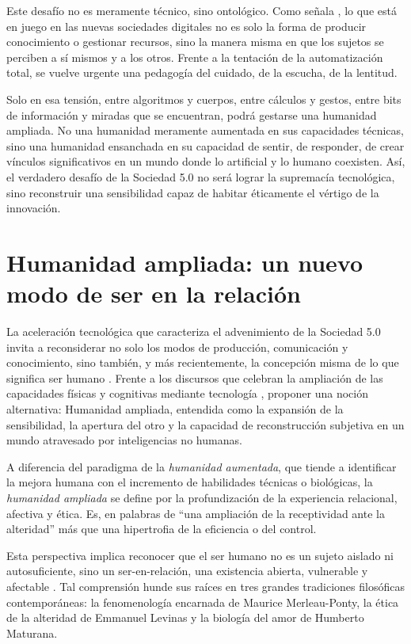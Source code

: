 \documentclass[spanish]{textolivre}
\begin{document}
Este desafío no es meramente técnico, sino ontológico. Como señala \textcite{sibilia2012}, lo que está en juego en las nuevas sociedades digitales no es solo la forma de producir conocimiento o gestionar recursos, sino la manera misma en que los sujetos se perciben a sí mismos y a los otros. Frente a la tentación de la automatización total, se vuelve urgente una pedagogía del cuidado, de la escucha, de la lentitud.

Solo en esa tensión, entre algoritmos y cuerpos, entre cálculos y gestos, entre bits de información y miradas que se encuentran, podrá gestarse una humanidad ampliada. No una humanidad meramente aumentada en sus capacidades técnicas, sino una humanidad ensanchada en su capacidad de sentir, de responder, de crear vínculos significativos en un mundo donde lo artificial y lo humano coexisten. Así, el verdadero desafío de la Sociedad 5.0 no será lograr la supremacía tecnológica, sino reconstruir una sensibilidad capaz de habitar éticamente el vértigo de la innovación.

\section{Humanidad ampliada: un nuevo modo de ser en la relación}
La aceleración tecnológica que caracteriza el advenimiento de la Sociedad 5.0 invita a reconsiderar no solo los modos de producción, comunicación y conocimiento, sino también, y más recientemente, la concepción misma de lo que significa ser humano \cite{bridle2018}. Frente a los discursos que celebran la ampliación de las capacidades físicas y cognitivas mediante tecnología \cite{harari2015}, proponer una noción alternativa: Humanidad ampliada, entendida como la expansión de la sensibilidad, la apertura del otro y la capacidad de reconstrucción subjetiva en un mundo atravesado por inteligencias no humanas. 

A diferencia del paradigma de la \textit{humanidad aumentada}, que tiende a identificar la mejora humana con el incremento de habilidades técnicas o biológicas, la \textit{humanidad ampliada} se define por la profundización de la experiencia relacional, afectiva y ética. Es, en palabras de \textcite[p. 48]{han2012} “una ampliación de la receptividad ante la alteridad” más que una hipertrofia de la eficiencia o del control. 

Esta perspectiva implica reconocer que el ser humano no es un sujeto aislado ni autosuficiente, sino un ser-en-relación, una existencia abierta, vulnerable y afectable \cite{seguelotondo2024}. Tal comprensión hunde sus raíces en tres grandes tradiciones filosóficas contemporáneas: la fenomenología encarnada de Maurice Merleau-Ponty, la ética de la alteridad de Emmanuel Levinas y la biología del amor de Humberto Maturana. 
\end{document}
